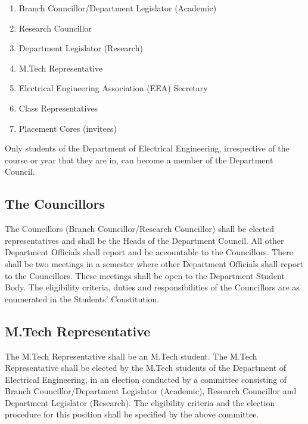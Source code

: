 \documentclass[12pt]{charter}
\begin{document}
\begin{enumerate}
	\item Branch Councillor/Department Legislator (Academic)
	\item Research Councillor
	\item Department Legislator (Research)
	\item M.Tech Representative
	\item Electrical Engineering Association (EEA) Secretary
	\item Class Representatives
	\item Placement Cores (invitees)
	
\end{enumerate}

Only students of the Department of Electrical Engineering, irrespective of the course or year that they are in, can become a member of the Department Council.

\subsection{The Councillors}

The Councillors (Branch Councillor/Research Councillor) shall be elected representatives and shall be the Heads of the Department Council. All other Department Officials shall report and be accountable to the Councillors. There shall be two meetings in a semester where other Department Officials shall report to the Councillors. These meetings shall be open to the Department Student Body. The eligibility criteria, duties and responsibilities of the Councillors are as enumerated in the Students’ Constitution.

\subsection{M.Tech Representative}

The M.Tech Representative shall be an M.Tech student. The M.Tech Representative shall be elected by the M.Tech students of the Department of Electrical Engineering, in an election conducted by a committee consisting of Branch Councillor/Department Legislator (Academic), Research Councillor and Department Legislator (Research). The eligibility criteria and the election procedure for this position shall be specified by the above committee.
\end{document}
